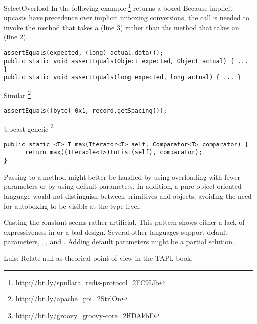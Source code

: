 \begin{pattern}{SelectOverload}
In the following example%
\footnote{\url{http://bit.ly/spullara_redis-protocol_2FC9Llb}}
 returns a boxed 
Because implicit upcasts have precedence over implicit unboxing conversions,
the call is needed to invoke the method that takes a 
  (line 3)
  rather than the method that takes an  (line 2).
%
\begin{verbatim}
assertEquals(expected, (long) actual.data());
public static void assertEquals(Object expected, Object actual) { ... }
public static void assertEquals(long expected, long actual) { ... }
\end{verbatim}


Similar%
\footnote{\url{http://bit.ly/apache_poi_2StrlOn}}

\begin{verbatim}
assertEquals((byte) 0x1, record.getSpacing());
\end{verbatim}

Upcast generic%
\footnote{\url{http://bit.ly/groovy_groovy-core_2HDAkbF}}

\begin{verbatim}
public static <T> T max(Iterator<T> self, Comparator<T> comparator) {
      return max((Iterable<T>)toList(self), comparator);
}
\end{verbatim}

\discussion{}
  Passing  to a method might better be handled by using overloading
  with fewer parameters or by using default parameters.
  In addition, a pure object-oriented language would not distinguish between primitives and 
  objects, avoiding the need for autoboxing to be visible at the type level.

Casting the  constant seems rather artificial.
This pattern shows either a lack of expressiveness in \java{} or
a bad \api{} design.
Several other languages support default parameters, \eg{},
\scala{}, \csharp{} and \cpp{}.
Adding default parameters might be a partial solution.

Luis: Relate null as theorical point of view in the TAPL book.

\end{pattern}